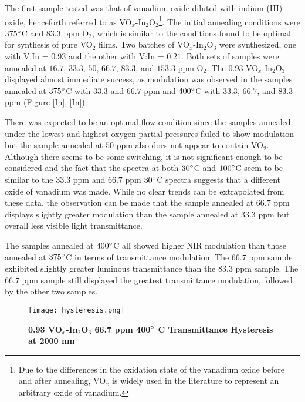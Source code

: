 \documentclass[a4paper]{article}
\begin{document}
The first sample tested was that of vanadium oxide diluted with indium (III) oxide, henceforth referred to as VO$_{x}$-In$_2$O$_2$\footnote{Due to the differences in the oxidation state of the vanadium oxide before and after annealing, VO$_x$ is widely used in the literature to represent an arbitrary oxide of vanadium.}. The initial annealing conditions were $375\degree$C and $83.3$ ppm O$_2$, which is similar to the conditions found to be optimal for synthesis of pure VO$_2$ films. Two batches of VO$_x$-In$_2$O$_3$ were synthesized, one with V:In = $0.93$ and the other with V:In = $0.21$. Both sets of samples were annealed at $16.7$, $33.3$, $50$, $66.7$, $83.3$, and $153.3$ ppm O$_2$. The $0.93$ VO$_x$-In$_2$O$_3$ displayed almost immediate success, as modulation was observed in the samples annealed at $375\degree $C with $33.3$ and $66.7$ ppm and $400\degree$C with $33.3$, $66.7$, and $83.3$ ppm  (Figure \ref{In}, \ref{In}). 


There was expected to be an optimal flow condition since the samples annealed under the lowest and highest oxygen partial pressures failed to show modulation but the sample annealed at $50$ ppm also does not appear to contain VO$_2$. Although there seems to be some switching, it is not significant enough to be considered and the fact that the spectra at both $30\degree$C and $100\degree$C seem to be similar to the $33.3$ ppm and $66.7$ ppm $30\degree$C spectra suggests that a different oxide of vanadium was made. While no clear trends can be extrapolated from these data, the observation can be made that the sample annealed at $66.7$ ppm displays slightly greater modulation than the sample annealed at $33.3$ ppm but overall less visible light transmittance. 


The samples annealed at $400\degree$C all showed higher NIR modulation than those annealed at $375\degree$C in terms of transmittance modulation. The $66.7$ ppm sample exhibited slightly greater luminous transmittance than the $83.3$ ppm sample. The $66.7$ ppm sample still displayed the greatest transmittance modulation, followed by the other two samples. 
    
    
\begin{figure*}[t]
\centering
\texttt{[image: hysteresis.png]}
\caption{\textbf{0.93 VO$_x$-In$_2$O$_3$ 66.7 ppm 400$\degree$ C Transmittance Hysteresis at 2000 nm}}
\label{hysteresis}
\end{figure*}
\end{document}
